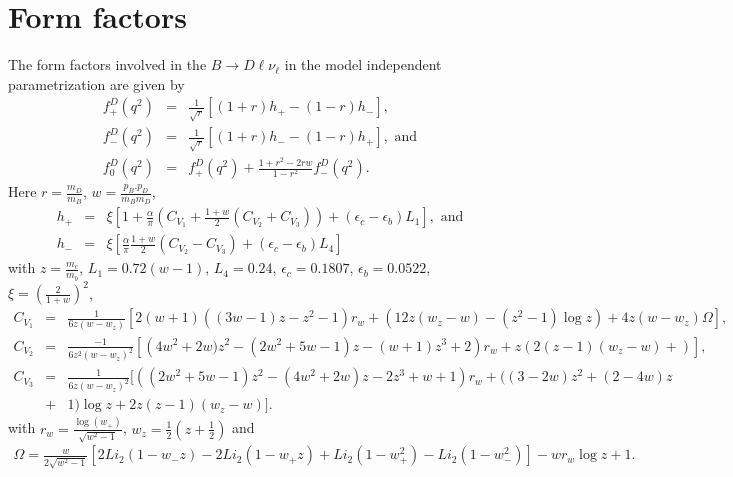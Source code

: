 \documentclass[a4paper,11pt]{article}
\begin{document}
		\section{Form factors}
		\label{appb}
		The form factors involved in the $B\rightarrow D\ell \nu_\ell$ in the model independent parametrization are given by \cite{Bernlochner:2017jka}
		\begin{eqnarray}
	f_{+}^D(q^2)&=&\frac{1}{\sqrt{r}}\left[(1+r) h_{+}-(1-r)h_{-}\right],\nonumber\\
	f_{-}^D(q^2)&=&\frac{1}{\sqrt{r}}\left[(1+r) h_{-}-(1-r)h_{+}\right], \text{ and}\nonumber\\
	f_{0}^D(q^2)&=& f_{+}^D(q^2)+\frac{1+r^{2}-2 r w}{1-r^{2}}f_{-}^D(q^2).\nonumber
	\end{eqnarray}
	Here $r=\frac{m_{D}}{m_{B}}$, $w=\frac{p_{B}.p_{D}}{m_{B}m_{D}}$, 
		\begin{eqnarray}
	h_{+}&=&\xi \left[1+\frac{\alpha}{\pi}\left(C_{V_{1}}+\frac{1+w}{2} \left(C_{V_{2}}+C_{V_{3}}\right)\right)+\left(\epsilon_{c}-\epsilon_{b}\right)L_{1} \right],  \text{ and}\nonumber\\
	h_{-}&=&\xi \left[\frac{\alpha}{\pi}\frac{1+w}{2} \left(C_{V_{2}}-C_{V_{3}}\right)+\left(\epsilon_{c}-\epsilon_{b}\right)L_{4} \right]\nonumber
	\end{eqnarray}
	with $z=\frac{m_{c}}{m_{b}}$, $L_{1}=0.72(w-1)$, $L_{4}=0.24$, $\epsilon_{c}=0.1807$, $\epsilon_{b}=0.0522$, $\xi=\left(\frac{2}{1+w}\right)^{2}$,
	\begin{eqnarray}
	C_{V_{1}}&=&\frac{1}{6z(w-w_{z})}\left[2(w+1)\left((3w-1)z-z^{2}-1\right)r_{w}+(12z(w_{z}-w)-(z^{2}-1)\log z)+4z (w-w_{z})\Omega \right],\nonumber\\
	C_{V_{2}}&=&\frac{-1}{6z^{2}(w-w_{z})^{2}}\left[\left(4w^{2}+2w)z^{2}-(2w^{2}+5w-1)z-(w+1)z^{3}+2\right) r_{w}+z\left(2(z-1)(w_{z}-w)+ \right)\right], \nonumber\\
	C_{V_{3}}&=&\frac{1}{6z(w-w_{z})^{2}}\Big[\left((2w^{2}+5w-1)z^{2}-(4w^{2}+2w)z-2z^{3}+w+1\right)r_{w}+\Big((3-2w)z^{2}+(2-4w)z\nonumber\\&+& 1\Big)\log z + 2z(z-1)(w_{z}-w)\Big].\nonumber 
	\end{eqnarray}
	 with $r_{w}=\frac{\log(w_{+})}{\sqrt{w^{2}-1}}$, $w_{z}=\frac{1}{2}\left(z+\frac{1}{2}\right)$ and
	\begin{eqnarray}
	\Omega=\frac{w}{2\sqrt{w^{2}-1}}\left[2 Li_{2}(1-w_{-}z)-2Li_{2}(1-w_{+}z)+Li_{2}(1-w_{+}^{2})-Li_{2}(1-w_{-}^{2})\right]- w r_{w} \log z+1.\nonumber
	\end{eqnarray}
\end{document}
